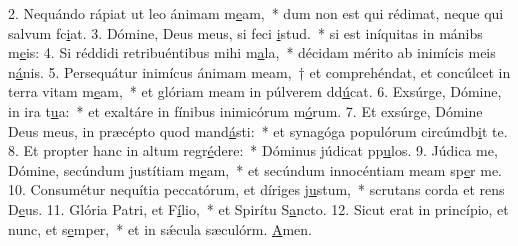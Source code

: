 2. Nequándo rápiat ut leo ánimam m\uline{e}am,~* dum non est qui rédimat, neque qui salvum fc\uline{i}at.
3. Dómine, Deus meus, si feci \uline{i}stud.~* si est iníquitas in mánibs m\uline{e}is:
4. Si réddidi retribuéntibus mihi m\uline{a}la,~* décidam mérito ab inimícis meis n\uline{á}nis.
5. Persequátur inimícus ánimam meam,~† et comprehéndat, et concúlcet in terra vitam m\uline{e}am,~* et glóriam meam in púlverem dd\uline{ú}cat.
6. Exsúrge, Dómine, in ira t\uline{u}a:~* et exaltáre in fínibus inimicórum m\uline{ó}rum.
7. Et exsúrge, Dómine Deus meus, in præcépto quod mand\uline{á}sti:~* et synagóga populórum circúmdb\uline{i}t te.
8. Et propter hanc in altum regr\uline{é}dere:~* Dóminus júdicat pp\uline{u}los.
9. Júdica me, Dómine, secúndum justítiam m\uline{e}am,~* et secúndum innocéntiam meam sp\uline{e}r me.
10. Consumétur nequítia peccatórum, et díriges j\uline{u}stum,~* scrutans corda et rens D\uline{e}us.
11. Glória Patri, et F\uline{í}lio,~* et Spirítu S\uline{a}ncto.
12. Sicut erat in princípio, et nunc, et s\uline{e}mper,~* et in sǽcula sæculórm. \uline{A}men.
